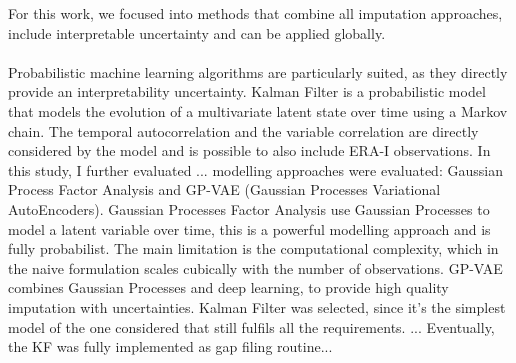 \documentclass{article}
\let\Oldsubsection\subsection
\renewcommand{\subsection}{\FloatBarrier\Oldsubsection}
\begin{document}
For this work, we focused into methods that combine all imputation approaches, include interpretable uncertainty and can be applied globally. 


\paragraph{}  Probabilistic machine learning algorithms are particularly suited, as they directly provide an interpretability uncertainty.
Kalman Filter is a probabilistic model that models the evolution of a multivariate latent state over time using a Markov chain. The temporal autocorrelation and the variable correlation are directly considered by the model and is possible to also include ERA-I observations.
In this study, I further evaluated  ... modelling approaches were evaluated: Gaussian Process Factor Analysis and GP-VAE (Gaussian Processes Variational AutoEncoders). Gaussian Processes Factor Analysis \cite{yu_gaussian-process_2008} use Gaussian Processes to model a latent variable over time, this is a powerful modelling approach and is fully probabilist. The main limitation is the computational complexity, which in the naive formulation scales cubically with the number of observations.
GP-VAE \cite{fortuin_gp-vae_2020} combines Gaussian Processes and deep learning, to provide high quality imputation with uncertainties.
Kalman Filter was selected, since it's the simplest model of the one considered that still fulfils all the requirements. ... Eventually, the KF was fully implemented as gap filing routine...
\end{document}
